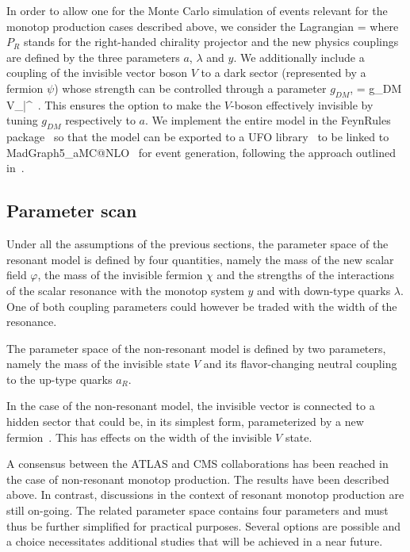      In order to allow one for the Monte Carlo simulation of events relevant for
     the monotop production cases described above, we consider the Lagrangian
     \be
       \lag =
     \ee
     where $P_R$ stands for the right-handed chirality projector and the new
     physics couplings are defined by the three parameters $a$, $\lambda$ and
     $y$. We additionally include a coupling of the invisible vector boson $V$
     to a dark sector (represented by a fermion $\psi$) whose strength can be
     controlled through a parameter $g_{DM}$,
     \be
       \lag = g_{DM} V_\mu \bar\psi \gamma^\mu\psi \ .
     \ee
     This ensures the option to make the $V$-boson effectively invisible by
     tuning $g_{DM}$ respectively to $a$. We implement the entire model in the
     {\sc FeynRules} package~\cite{Alloul:2013bka} so that the model can be
     exported to a UFO library~\cite{Degrande:2011ua} to be linked to
     {\sc MadGraph5\_aMC@NLO}~\cite{Alwall:2014hca} for event generation,
     following the approach outlined in~\cite{Christensen:2009jx}.


\subsection{Parameter scan}

Under all the assumptions of the previous sections, the parameter space of
the resonant model is defined by four quantities, namely the mass of the
new scalar field $\varphi$, the mass of the invisible fermion $\chi$ and
the strengths of the interactions of the scalar resonance with the monotop
system $y$ and with down-type quarks $\lambda$. One of both coupling
parameters could however be traded with the width of the resonance.

The parameter space of the non-resonant model is defined by two
parameters, namely the mass of the invisible state $V$ and its
flavor-changing neutral coupling to the up-type quarks $a_R$.

In the case of the non-resonant model, the invisible vector is connected to
a hidden sector that could be, in its simplest form, parameterized by a new
fermion~\cite{Boucheneb:2014wza}. This has effects on the width of the invisible $V$ state.

A consensus between the ATLAS and CMS collaborations has been reached in
the case of non-resonant monotop production. The results have been
described above. In contrast, discussions in the context of resonant
monotop production are still on-going. The related parameter space
contains four parameters and must thus be further simplified for practical
purposes. Several options are possible and a choice necessitates additional
studies that will be achieved in a near future.

